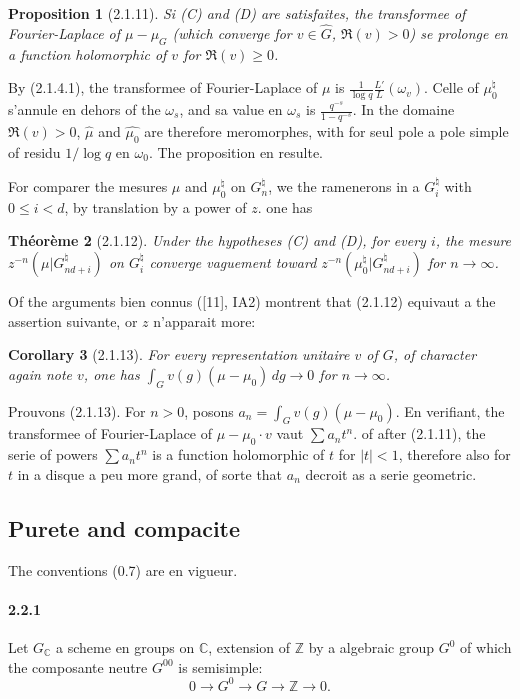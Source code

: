 \documentclass[12pt,a4paper]{article}
\theoremstyle{plain}
\newtheorem{theorem}{Th\'eor\`eme}[section]
\newtheorem{proposition}[theorem]{Proposition}
\newtheorem{corollary}[theorem]{Corollary}
\theoremstyle{definition}
\theoremstyle{remark}
\newcommand{\CC}{{\mathbb{C}}}
\newcommand{\ZZ}{{\mathbb{Z}}}
\begin{document}
\begin{proposition}[2.1.11]
Si (C) and (D) are satisfaites, the transformee of Fourier-Laplace of $\mu - \mu_G$ (which converge for $v \in \widehat{G}$, $\Re(v) > 0$) se prolonge en a function holomorphic of $v$ for $\Re(v) \geq 0$.
\end{proposition}

By (2.1.4.1), the transformee of Fourier-Laplace of $\mu$ is $\frac{1}{\log q} \frac{L'}{L}(\omega_v)$. Celle of $\mu_0^\natural$ s'annule en dehors of the $\omega_s$, and sa value en $\omega_s$ is $\frac{q^{-s}}{1 - q^{-s}}$. In the domaine $\Re(v) > 0$, $\widehat{\mu}$ and $\widehat{\mu_0}$ are therefore meromorphes, with for seul pole a pole simple of residu $1/\log q$ en $\omega_0$. The proposition en resulte.

For comparer the mesures $\mu$ and $\mu_0^\natural$ on $G_n^\natural$, we the ramenerons in a $G_i^\natural$ with $0 \leq i < d$, by translation by a power of $z$. one has

\begin{theorem}[2.1.12]
Under the hypotheses (C) and (D), for every $i$, the mesure $z^{-n}(\mu|G_{nd+i}^\natural)$ on $G_i^\natural$ converge vaguement toward $z^{-n}(\mu_0^\natural|G_{nd+i}^\natural)$ for $n \to \infty$.
\end{theorem}

Of the arguments bien connus ([11], IA2) montrent that (2.1.12) equivaut a the assertion suivante, or $z$ n'apparait more:

\begin{corollary}[2.1.13]
For every representation unitaire $v$ of $G$, of character again note $v$, one has $\int_G v(g)(\mu - \mu_0)\, dg \to 0$ for $n \to \infty$.
\end{corollary}

Prouvons (2.1.13). For $n > 0$, posons $a_n = \int_G v(g)(\mu - \mu_0)$. En verifiant, the transformee of Fourier-Laplace of $\mu - \mu_0 \cdot v$ vaut $\sum a_n t^n$. of after (2.1.11), the serie of powers $\sum a_n t^n$ is a function holomorphic of $t$ for $|t| < 1$, therefore also for $t$ in a disque a peu more grand, of sorte that $a_n$ decroit as a serie geometric.


\subsection{Purete and compacite}

The conventions (0.7) are en vigueur.

\paragraph{2.2.1}
Let $G_\CC$ a scheme en groups on $\CC$, extension of $\ZZ$ by a algebraic group $G^0$ of which the composante neutre $G^{00}$ is semisimple:
\begin{equation}\label{eq:2.2.1.1}
0 \to G^0 \to G \to \ZZ \to 0.
\end{equation}
\end{document}

